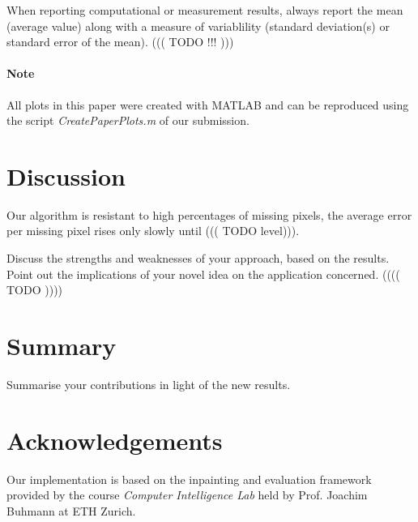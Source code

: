 \documentclass[10pt,conference,compsocconf]{IEEEtran}
\begin{document}
When reporting computational or measurement results, always
report the mean (average value) along with a measure of variablility
(standard deviation(s) or standard error of the mean). ((( TODO !!! )))

\paragraph{Note} All plots in this paper were created with MATLAB and can be reproduced using the script \emph{CreatePaperPlots.m} of our submission.

\section{Discussion}
Our algorithm is resistant to high percentages of missing pixels, the average error per missing pixel rises only slowly until ((( TODO level))). 


Discuss the strengths and weaknesses of your approach, based on the results. Point out the implications of your novel idea on the application concerned. (((( TODO ))))


\section{Summary}
Summarise your contributions in light of the new results.

\section*{Acknowledgements}
Our implementation is based on the inpainting and evaluation framework provided by the course \emph{Computer Intelligence Lab} held by Prof. Joachim Buhmann at ETH Zurich.



\end{document}

